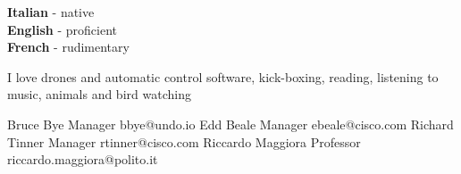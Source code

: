 \documentclass[8pt]{developercv} %
\begin{document}
\begin{minipage}[t]{0.3\textwidth}
	\vspace{-\baselineskip} %

	
	\textbf{Italian} - native\\
	\textbf{English} - proficient\\
	\textbf{French} - rudimentary
\end{minipage}
\hfill
\begin{minipage}[t]{0.3\textwidth}
	\vspace{-\baselineskip} %
	
	
	I love drones and automatic control software, kick-boxing, reading, listening to music, animals and bird watching
\end{minipage}
\hfill
\begin{minipage}[t]{0.3\textwidth}
	\vspace{-\baselineskip} %
\begin{entrylist}
 {Bruce Bye} {Manager} {bbye@undo.io}
 {Edd Beale} {Manager} {ebeale@cisco.com}
 {Richard Tinner} {Manager} {rtinner@cisco.com}
 {Riccardo Maggiora} {Professor} {riccardo.maggiora@polito.it}
\end{entrylist}
\end{minipage}

\end{document}
